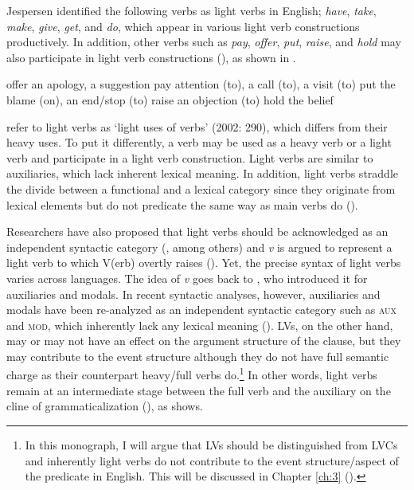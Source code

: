 Jespersen identified the following verbs as light verbs in English; \textit{have}, \textit{take}, \textit{make}, \textit{give}, \textit{get}, and \textit{do}, which appear in various light verb constructions productively. In addition, other verbs such as \textit{pay}, \textit{offer}, \textit{put}, \textit{raise}, and \textit{hold} may also participate in light verb constructions (\citealt[296,~1093]{HuddlestonPullum2002}), as shown in . 

\begin{exe}\ex\label{ex:24}
\begin{xlist}
\ex offer an apology, a suggestion
\ex pay attention (to), a call (to), a visit (to)
\ex put the blame (on), an end/stop (to)
\ex raise an objection (to)
\ex hold the belief
\end{xlist}
\end{exe}

\citeauthor{HuddlestonPullum2002} refer to light verbs as ‘light uses of verbs’ (2002: 290), which differs from their heavy uses. To put it differently, a verb may be used as a heavy verb or a light verb and participate in a light verb construction. Light verbs are similar to auxiliaries, which lack inherent lexical meaning. In addition, light verbs straddle the divide between a functional and a lexical category since they originate from lexical elements but do not predicate the same way as main verbs do (\citealt[4]{Butt2003}).

Researchers have also proposed that light verbs should be acknowledged as an independent syntactic category (\citealt{Adger2003,Butt2003}, among others) and \textit{v} is argued to represent a light verb to which V(erb) overtly raises (\citealt{Arad1999,Chomsky1995,Harley1999,Marantz1997}). Yet, the precise syntax of light verbs varies across languages. The idea of \textit{v} goes back to \citet{Chomsky1957}, who introduced it for auxiliaries and modals. In recent syntactic analyses, however, auxiliaries and modals have been re-analyzed as an independent syntactic category such as \textsc{aux} and \textsc{mod}, which inherently lack any lexical meaning (\citealt{Butt2003}). \Acp{LV}, on the other hand, may or may not have an effect on the argument structure of the clause, but they may contribute to the event structure although they do not have full semantic charge as their counterpart heavy/full verbs do.\footnote{In this monograph, I will argue that \acp{LV} should be distinguished from \acp{LVC} and inherently light verbs do not contribute to the event structure/aspect of the predicate in English. This will be discussed in Chapter \ref{ch:3} ().} In other words, light verbs remain at an intermediate stage between the full verb and the auxiliary on the cline of grammaticalization (\citealt{Hook1974}), as  shows. 

